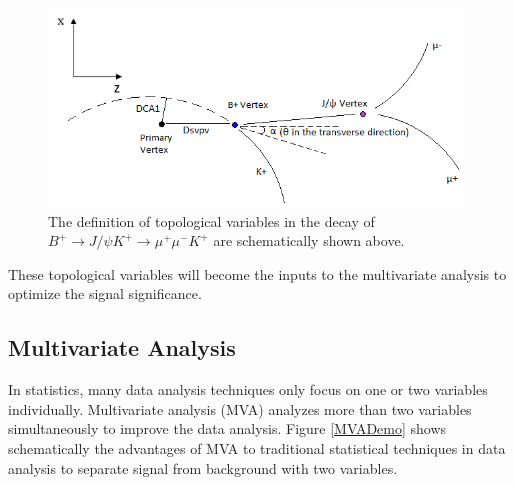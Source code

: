 \begin{figure}[h]
\begin{center}
\includegraphics[width= 0.98\textwidth]{Figures/Chapter4/BPDecay.png}
\caption{The definition of topological variables in the decay of $B^+ \rightarrow J/\psi K^+ \rightarrow \mu^+\mu^- K^+ $ are schematically shown above.}
\label{DecayTopoBP}
\end{center}
\end{figure}

These topological variables will become the inputs to the multivariate analysis to optimize the signal significance.

\subsection{Multivariate Analysis}

In statistics, many data analysis techniques only focus on one or two variables individually. Multivariate analysis (MVA) analyzes more than two variables simultaneously to improve the data analysis. Figure \ref{MVADemo} shows schematically the advantages of MVA to traditional statistical techniques in data analysis to separate signal from background with two variables. 




